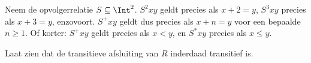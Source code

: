 \documentclass[../../../include/open-logic-section]{subfiles}
\begin{document}
\begin{ex}
Neem de opvolgerrelatie $S \subseteq \Int^2$. $S^2xy$ geldt precies als
$x + 2 = y$, $S^3xy$ precies als $x + 3 = y$, enzovoort. $S^+xy$ geldt dus
precies als $x + n = y$ voor een bepaalde $n \geq 1$. Of korter: $S^+xy$
geldt precies als $x < y$, en $S^*xy$ precies als $x \le y$.
\end{ex}

\begin{prob}
Laat zien dat de transitieve afsluiting van $R$ inderdaad transitief is.
\end{prob}
\end{document}

